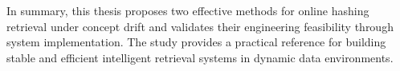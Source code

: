 \begin{eabstract}
In summary, this thesis proposes two effective methods for online hashing retrieval under concept drift and validates their engineering feasibility through system implementation. The study provides a practical reference for building stable and efficient intelligent retrieval systems in dynamic data environments.

\end{eabstract}
